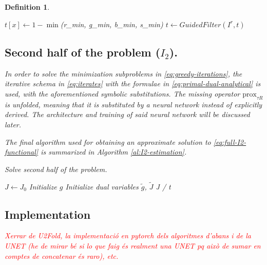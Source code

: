 \documentclass[twocolumn,twoside,a4paper,10pt]{IEEEtran}
\newtheorem{definition}{Definition}
\newcommand{\Frank}[1]{\textcolor{red}{#1}}
\begin{document}
\begin{definition}
\begin{algorithm}
{  \(t[x] \gets 1 -\min\)(r\_min, g\_min, b\_min, s\_min)
}
\(t \gets GuidedFilter(I^r, t)\)\;

\end{algorithm}

\subsection{Second half of the problem (\(I_2\)).}
In order to solve the minimization subproblems in \cref{eq:greedy-iterations}, the iterative schema in \cref{eq:iterates} with the formulae in \cref{eq:primal-dual-analytical} is used, with the aforementioned symbolic substitutions. The missing operator \(\text{prox}_{\tau R}\) is unfolded, meaning that it is substituted by a neural network instead of explicitly derived. The architecture and training of said neural network will be discussed later.

The final algorithm used for obtaining an approximate solution to \cref{eq:full-I2-functional} is summarized in Algorithm \ref{al:I2-estimation}.

\begin{algorithm}\caption{Solve second half of the problem.}
\label{al:I2-estimation}
\KwData{\sigma, \tau}
\(J\gets J_0\)\;
Initialize \(g\)\; 
Initialize dual variables \(\tilde{g}\), \(\tilde{J}\)\;
\Return J / t
\end{algorithm}

\subsection{Implementation}
\Frank{Xerrar de U2Fold, la implementació en pytorch dels algoritmes d'abans i de la UNET (he de mirar bé si lo que faig és realment una UNET pq això de sumar en comptes de concatenar és raro), etc.}

\end{definition}
\end{document}
